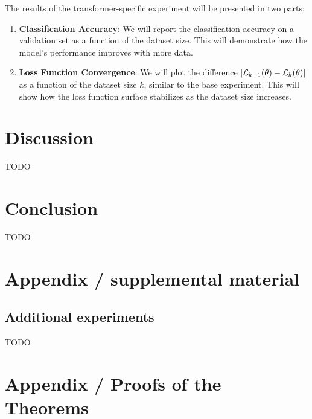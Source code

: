 \documentclass{article}
\begin{document}
The results of the transformer-specific experiment will be presented in two parts:
\begin{enumerate}
\item \textbf{Classification Accuracy}: We will report the classification accuracy on a validation set as a function of the dataset size. This will demonstrate how the model's performance improves with more data.
\item \textbf{Loss Function Convergence}: We will plot the difference 
$|\mathcal{L}_{k + 1}(\theta) - \mathcal{L}_{k}(\theta)|$ as a function of the dataset size $k$, similar to the base experiment. This will show how the loss function surface stabilizes as the dataset size increases.
\end{enumerate}

\section{Discussion}\label{sec:disc}

TODO

\section{Conclusion}\label{sec:concl}

TODO







\newpage
\appendix
\section{Appendix / supplemental material}\label{app:A}

\subsection{Additional experiments}\label{app:exp}

TODO


\section{Appendix / Proofs of the Theorems}\label{app:B}
\end{document}

